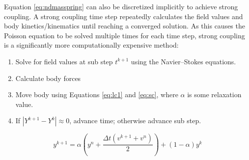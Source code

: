 \documentclass[preprint,12pt]{elsarticle}
\begin{document}
Equation \eqref{eq:ndmasspring} can also be discretized implicitly to achieve strong coupling.
A strong coupling time step repeatedly calculates the field values and body kinetics/kinematics until reaching a converged solution.
As this causes the Poisson equation to be solved multiple times for each time step, strong coupling is a significantly more computationally expensive method:
\begin{enumerate}
	\item Solve for field values at sub step $t^{k+1}$ using the Navier--Stokes equations.
	\item Calculate body forces
	\item Move body using Equations \eqref{eq:lc1} and \eqref{eq:sc}, where $\alpha$ is some relaxation value.
	\item If $|Y^{k+1}-Y^k| \approx 0$, advance time; otherwise advance sub step.
\end{enumerate}
\begin{equation}
y^{k+1} = \alpha \left(y^n+\frac{\Delta t\left(v^{k+1}+v^n\right)}{2}\right) +\left(1-\alpha\right)y^k\label{eq:sc}
\end{equation}
\end{document}
